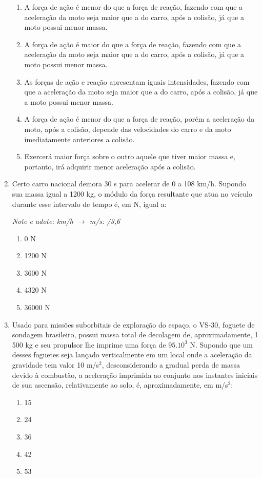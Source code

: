 \documentclass[12pt,letterpaper,fleqn]{article}
\begin{document}
\begin{enumerate}
\begin{enumerate}
    \item A força de ação é menor do que a força de reação, fazendo com que a aceleração da moto seja maior que a do carro, após a colisão, já que a moto possui menor massa.
    \item A força de ação é maior do que a força de reação, fazendo com que a aceleração da moto seja maior que a do carro, após a colisão, já que a moto possui menor massa.
    \item As forças de ação e reação apresentam iguais intensidades, fazendo com que a aceleração da moto seja maior que a do carro, após a colisão, já que a moto possui menor massa.
    \item A força de ação é menor do que a força de reação, porém a aceleração da moto, após a colisão, depende das velocidades do carro e da moto imediatamente anteriores a colisão.
    \item Exercerá maior força sobre o outro aquele que tiver maior massa e, portanto, irá adquirir menor aceleração após a colisão.
\end{enumerate}

\item Certo carro nacional demora 30 s para acelerar de 0 a 108 km/h. Supondo sua massa igual a 1200 kg, o módulo da força resultante que atua no veículo durante esse intervalo de tempo é, em N, igual a:

\textit{Note e adote: km/h $\rightarrow$ m/s: /3,6}

\begin{enumerate}
    \item 0 N
    \item 1200 N
    \item 3600 N
    \item 4320 N
    \item 36000 N
\end{enumerate}

\item Usado para missões suborbitais de exploração do espaço, o VS-30, foguete de sondagem brasileiro, possui massa total de decolagem de, aproximadamente, 1 500 kg e seu propulsor lhe imprime uma força de $95.10^3$ N. Supondo que um desses foguetes seja lançado verticalmente em um local onde a aceleração da gravidade tem valor 10 m/s$^2$, desconsiderando a gradual perda de massa devido à combustão, a aceleração imprimida ao conjunto nos instantes iniciais de sua ascensão, relativamente ao solo, é, aproximadamente, em m/s$^2$:
\begin{enumerate}
    \item 15
    \item 24
    \item 36
    \item 42
    \item 53
\end{enumerate}


\end{enumerate}
\end{document}

